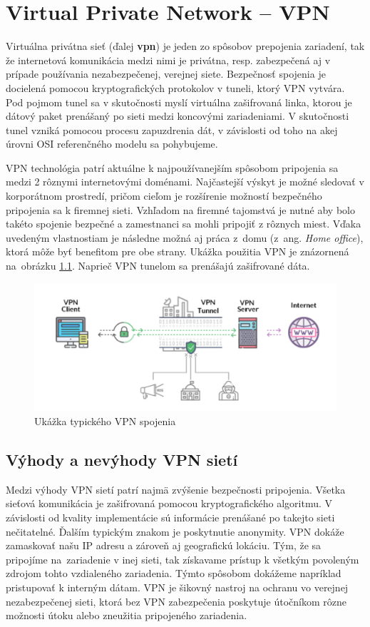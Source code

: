 
\chapter{Virtual Private Network -- VPN}\label{1}
Virtuálna privátna sieť (ďalej \textbf{\acrshort{vpn}}) je jeden zo spôsobov prepojenia zariadení, tak že internetová komunikácia medzi nimi je privátna, resp. zabezpečená aj v prípade používania nezabezpečenej, verejnej siete. Bezpečnosť spojenia je docielená pomocou kryptografických protokolov v tuneli, ktorý VPN vytvára. Pod pojmom tunel sa v skutočnosti myslí virtuálna zašifrovaná linka, ktorou je dátový paket prenášaný po sieti medzi koncovými zariadeniami. V skutočnosti tunel vzniká pomocou procesu zapuzdrenia dát, v závislosti od toho na akej úrovni OSI referenčného modelu sa pohybujeme. 

VPN technológia patrí aktuálne k najpoužívanejším spôsobom pripojenia sa medzi 2 rôznymi internetovými doménami. Najčastejší výskyt je možné sledovať v korporátnom prostredí, pričom cieľom je rozšírenie možností bezpečného pripojenia sa k firemnej sieti. Vzhľadom na firemné tajomstvá je nutné aby bolo takéto spojenie bezpečné a zamestnanci sa mohli pripojiť z rôznych miest. Vďaka uvedeným vlastnostiam je následne možná aj práca z~domu (z~ang. \textit{Home office}), ktorá môže byť benefitom pre obe strany. Ukážka použitia VPN je znázornená na~obrázku \ref{vpnfancy}. Naprieč VPN tunelom sa prenášajú zašifrované dáta.

\begin{figure}[!h]
	\centering
	\includegraphics[width=0.95\linewidth]{figures/vpn_fancy}
	\caption{Ukážka typického VPN spojenia}
	\label{vpnfancy}
\end{figure}

\section{Výhody a nevýhody VPN sietí}
Medzi výhody VPN sietí patrí najmä zvýšenie bezpečnosti pripojenia. Všetka sieťová komunikácia je zašifrovaná pomocou kryptografického algoritmu. V závislosti od kvality implementácie sú informácie prenášané po takejto sieti nečitatelné. Ďalším typickým znakom je poskytnutie anonymity. VPN dokáže zamaskovať našu IP adresu a zároveň aj geografickú lokáciu. Tým, že sa pripojíme na~zariadenie v inej sieti, tak získavame prístup k všetkým povoleným zdrojom tohto vzdialeného zariadenia. Týmto spôsobom dokážeme napríklad pristupovať k interným dátam.
VPN je šikovný nastroj na ochranu vo verejnej nezabezpečenej sieti, ktorá bez VPN zabezpečenia poskytuje útočníkom rôzne možnosti útoku alebo zneužitia pripojeného zariadenia.

